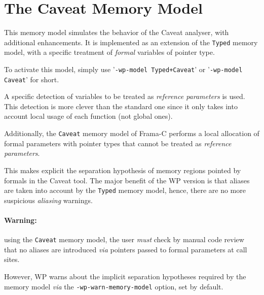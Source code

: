 \section{The Caveat Memory Model}
\label{CAVEAT}

This memory model simulates the behavior of the \textsf{Caveat}
analyser, with additional enhancements.  It is implemented as an
extension of the \texttt{Typed} memory model, with a specific
treatment of \textit{formal} variables of pointer type.

To activate
this model, simply use '\verb$-wp-model Typed+Caveat$' or
'\verb$-wp-model Caveat$' for short.

A specific detection of variables to be treated as \textit{reference
  parameters} is used.  This detection is more clever than the standard one
since it only takes into account local usage of each function (not
global ones).


Additionally, the \texttt{Caveat} memory model of \textsf{Frama-C}
performs a local allocation of formal parameters with pointer
types that cannot be treated as \textit{reference parameters}. 

This makes explicit the separation hypothesis of memory regions
pointed by formals in the \textsf{Caveat} tool. The major benefit of
the \textsf{WP} version is that aliases are taken into account by the
\texttt{Typed} memory model, hence, there are no more suspicious
\textit{aliasing} warnings.

\paragraph{Warning:} using the \texttt{Caveat} memory model, 
the user \emph{must} check by manual code review that no aliases are
introduced \emph{via} pointers passed to formal parameters at call sites.

However, \textsf{WP} warns about the implicit separation hypotheses required by
the memory model \textit{via} the \texttt{-wp-warn-memory-model} option, set
by default.
